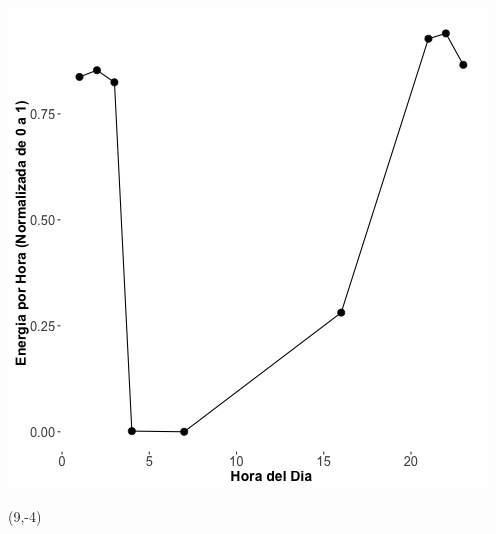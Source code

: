 \documentclass{article}\usepackage[]{graphicx}\usepackage[]{color}
\newenvironment{knitrout}{}{} %
\begin{document}
\begin{knitrout}
\color{fgcolor}
\includegraphics[scale=0.75]{figure/A12_fplot_norm_median} 
\end{knitrout}


 \begin{textblock}{1}(9,-4)
\begin{minipage}{20em}
\begingroup

\endgroup
\end{minipage}
\end{textblock}

 \vspace{2cm}


%

\vspace{20cm}
 
\end{document}
